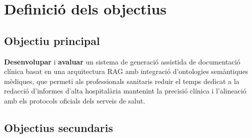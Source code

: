 \documentclass[11pt,a4paper]{article}
\begin{document}
\section*{Definició dels objectius}

\subsection*{Objectiu principal}

\textbf{Desenvolupar} i \textbf{avaluar} un sistema de generació assistida de documentació clínica basat en una arquitectura RAG amb integració d'ontologies semàntiques mèdiques, que permeti als professionals sanitaris reduir el temps dedicat a la redacció d'informes d'alta hospitalària mantenint la precisió clínica i l'alineació amb els protocols oficials dels serveis de salut.

\subsection*{Objectius secundaris}
\end{document}
